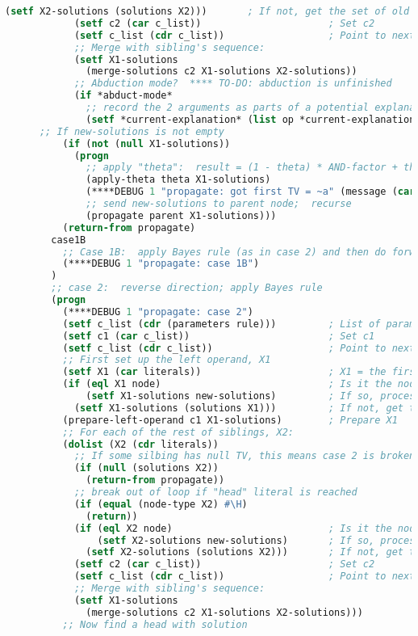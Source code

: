 \begin{lstlisting}[language=Lisp]
              (setf X2-solutions (solutions X2)))       ; If not, get the set of old solutions
            (setf c2 (car c_list))                      ; Set c2
            (setf c_list (cdr c_list))                  ; Point to next element
            ;; Merge with sibling's sequence:
            (setf X1-solutions
              (merge-solutions c2 X1-solutions X2-solutions))
            ;; Abduction mode?  **** TO-DO: abduction is unfinished
            (if *abduct-mode*
              ;; record the 2 arguments as parts of a potential explanation
              (setf *current-explanation* (list op *current-explanation* arg))))
      ;; If new-solutions is not empty
          (if (not (null X1-solutions))
            (progn
              ;; apply "theta":  result = (1 - theta) * AND-factor + theta * OR-factor
              (apply-theta theta X1-solutions)
              (****DEBUG 1 "propagate: got first TV = ~a" (message (car X1-solutions)))
              ;; send new-solutions to parent node;  recurse
              (propagate parent X1-solutions)))
          (return-from propagate)
        case1B
          ;; Case 1B:  apply Bayes rule (as in case 2) and then do forward (as in case 1A)
          (****DEBUG 1 "propagate: case 1B")
        )
        ;; case 2:  reverse direction; apply Bayes rule
        (progn
          (****DEBUG 1 "propagate: case 2")
          (setf c_list (cdr (parameters rule)))         ; List of parameters c1,c2,...
          (setf c1 (car c_list))                        ; Set c1
          (setf c_list (cdr c_list))                    ; Point to next element
          ;; First set up the left operand, X1
          (setf X1 (car literals))                      ; X1 = the first literal
          (if (eql X1 node)                             ; Is it the node with new solutions?
              (setf X1-solutions new-solutions)         ; If so, process new-solutions *only*
            (setf X1-solutions (solutions X1)))         ; If not, get the set of old solutions
          (prepare-left-operand c1 X1-solutions)        ; Prepare X1
          ;; For each of the rest of siblings, X2:
          (dolist (X2 (cdr literals))
            ;; If some silbing has null TV, this means case 2 is broken
            (if (null (solutions X2))
              (return-from propagate))
            ;; break out of loop if "head" literal is reached
            (if (equal (node-type X2) #\H)
              (return))
            (if (eql X2 node)                           ; Is it the node with new solutions?
                (setf X2-solutions new-solutions)       ; If so, process new-solutions *only*
              (setf X2-solutions (solutions X2)))       ; If not, get the set of old solutions
            (setf c2 (car c_list))                      ; Set c2
            (setf c_list (cdr c_list))                  ; Point to next element
            ;; Merge with sibling's sequence:
            (setf X1-solutions
              (merge-solutions c2 X1-solutions X2-solutions)))
          ;; Now find a head with solution
              

\end{lstlisting}
